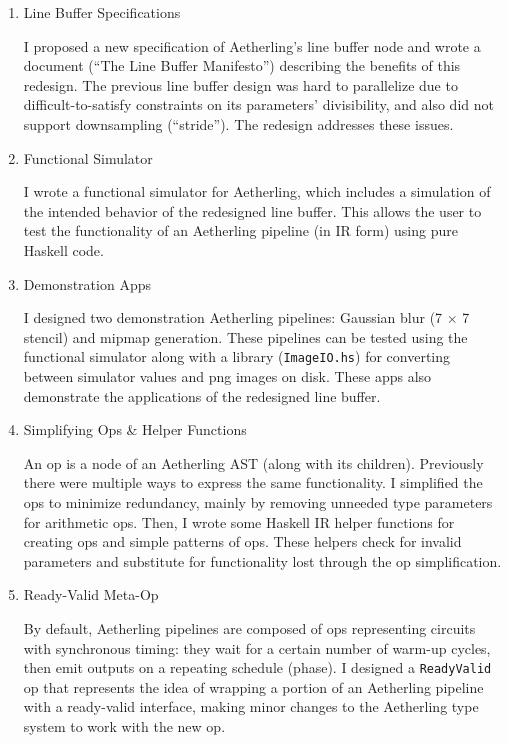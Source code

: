 \documentclass[12pt]{article}
\begin{document}
\begin{enumerate}

\item Line Buffer Specifications

I proposed a new specification of Aetherling's line buffer node and
wrote a document (``The Line Buffer Manifesto'') describing the
benefits of this redesign. The previous line buffer design was hard to
parallelize due to difficult-to-satisfy constraints on its parameters'
divisibility, and also did not support downsampling (``stride'').
The redesign addresses these issues.


\item Functional Simulator

I wrote a functional simulator for Aetherling, which includes a
simulation of the intended behavior of the redesigned line
buffer. This allows the user to test the functionality of an
Aetherling pipeline (in IR form) using pure Haskell code.

\item Demonstration Apps

I designed two demonstration Aetherling pipelines: Gaussian blur (7
$\times$ 7 stencil) and mipmap generation. These pipelines can be
tested using the functional simulator along with a library
(\texttt{ImageIO.hs}) for converting between simulator values and png
images on disk. These apps also demonstrate the applications of the
redesigned line buffer.

\item Simplifying Ops \& Helper Functions

An op is a node of an Aetherling AST (along with its
children). Previously there were multiple ways to express the same
functionality. I simplified the ops to minimize redundancy, mainly by
removing unneeded type parameters for arithmetic ops. Then, I wrote
some Haskell IR helper functions for creating ops and simple patterns
of ops. These helpers check for invalid parameters and substitute for
functionality lost through the op simplification.

\item Ready-Valid Meta-Op

By default, Aetherling pipelines are composed of ops representing
circuits with synchronous timing: they wait for a certain number of
warm-up cycles, then emit outputs on a repeating schedule (phase). I
designed a \texttt{ReadyValid} op that represents the idea of wrapping
a portion of an Aetherling pipeline with a ready-valid interface,
making minor changes to the Aetherling type system to work with the
new op.


\end{enumerate}
\end{document}
